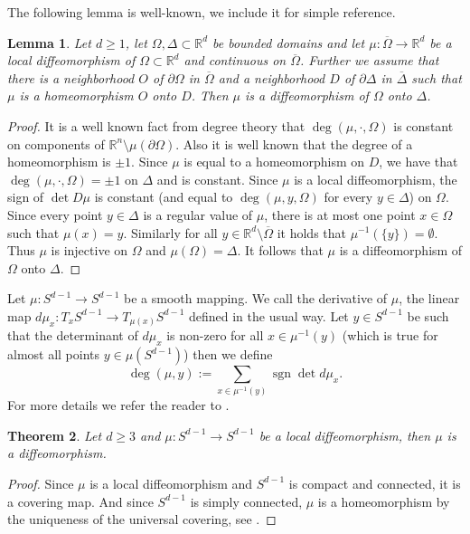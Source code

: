 \documentclass[12pt,a4paper]{amsart}
\theoremstyle{plain}
\newtheorem{thm}{Theorem}[section]
\newtheorem{lemma}[thm]{Lemma}
\theoremstyle{definition}
\numberwithin{equation}{section}
\def\sgn{\operatorname{sgn}}
\def\rn{\mathbb R^n}
\def\sgn{\operatorname{sgn}}
\begin{document}
	The following lemma is well-known, we include it for simple reference.
	\begin{lemma}\label{Book}
		Let $d\geq 1$, let $\Omega, \Delta \subset \mathbb{R}^d$ be bounded domains and let $\mu:\overline{\Omega}\to \mathbb{R}^d$ be a local diffeomorphism of $\Omega\subset \mathbb{R}^d$ and continuous on $\overline{\Omega}$. Further we assume that there is a neighborhood $O$ of $\partial\Omega$ in $\overline{\Omega}$ and a neighborhood $D$ of $\partial\Delta$ in $\overline{\Delta}$ such that $\mu$ is a homeomorphism $O$ onto $D$. Then $\mu$ is a diffeomorphism of $\Omega$ onto $\Delta$. 
	\end{lemma}
	\begin{proof}
		It is a well known fact from degree theory that $\deg(\mu, \cdot, \Omega)$ is constant on components of $\rn\setminus \mu(\partial \Omega)$. Also it is well known that the degree of a homeomorphism is $\pm 1$.  Since $\mu$ is equal to a homeomorphism on $D$, we have that $\deg(\mu,\cdot,  \Omega) =\pm 1$ on $\Delta$ and is constant. Since $\mu$ is a local diffeomorphism, the sign of $\det D\mu$ is constant (and equal to $\deg(\mu, y,\Omega)$ for every $y\in \Delta$) on $\Omega$. Since every point $y\in \Delta$ is a regular value of $\mu$, there is at most one point $x\in \Omega$ such that $\mu(x) = y$. Similarly for all $y\in \mathbb{R}^d\setminus \overline{\Omega}$ it holds that $\mu^{-1}(\{y\})= \emptyset$. Thus $\mu$ is injective on $\Omega$ and $\mu(\Omega) = \Delta$. It follows that $\mu$ is a diffeomorphism of $\Omega$ onto $\Delta$.
	\end{proof}
	
	Let $\mu:S^{d-1} \to S^{d-1}$ be a smooth mapping. We call the derivative of $\mu$, the linear map $d\mu_x:T_xS^{d-1}\to T_{\mu(x)}S^{d-1}$ defined in the usual way. Let $y\in S^{d-1}$ be such that the determinant of $d\mu_x$ is non-zero for all $x\in \mu^{-1}(y)$ (which is true for almost all points $y\in \mu(S^{d-1})$) then we define
	$$\deg(\mu,y):=\sum_{x\in \mu^{-1}(y)}\sgn \det d\mu_x.$$
	For more details we refer the reader to \cite[Chapter~5]{Milnor}.
	
	\begin{thm}\label{AlgTop}
		Let $d\geq 3$ and $\mu:S^{d-1} \to S^{d-1}$ be a local diffeomorphism, then $\mu$ is a diffeomorphism.
	\end{thm}
	
	\begin{proof}
		Since $\mu$ is a local diffeomorphism and $S^{d-1}$ is compact and connected, it is a covering map. And since $S^{d-1}$ is simply connected, $\mu$ is a homeomorphism by the uniqueness of the universal covering, see \cite[Proposition 1.37]{AlgTopHatcher}.
	\end{proof}
	
\end{document}
